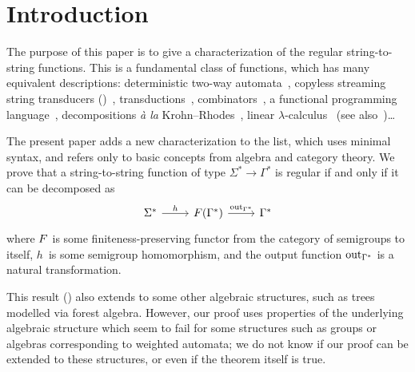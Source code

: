 \section{Introduction}
\label{sec:intro}

The purpose of this paper is to give a characterization of the regular string-to-string functions. This is a fundamental class of functions, which has many equivalent descriptions: deterministic two-way automata~\cite[Note~4]{shepherdson1959reduction}, copyless streaming string transducers (\sst)~\cite[Section~3]{alurExpressivenessStreamingString2010}, \mso transductions~\cite[Theorem~13]{engelfrietMSODefinableString2001}, combinators~\cite[Section~2]{alur2014regular}, a functional programming language~\cite[Section~6]{bojanczykRegularFirstOrderList2018}, decompositions \textit{à la} Krohn--Rhodes~\cite[Theorem~18, item~4]{bojanczykstefanski2020}, linear $\lambda$-calculus~\cite[Theorem~3]{LambdaTransducer} (see also~\cite[Claim~6.2]{IATLC})\ldots

The present paper adds a new characterization to the list, which uses minimal syntax, and refers only to basic concepts from algebra and category theory. We prove that a string-to-string function of type $\Sigma^* \to \Gamma^*$ is regular
if and only if it can be decomposed as 
\[
\begin{tikzcd}
    \Sigma^* 
    \ar[r,"h"]
    & 
    \functor(\Gamma^*)
    \ar[r,"\outfun_{\Gamma^*}"]
    &
    \Gamma^*
\end{tikzcd}
\]
where $\functor$ is some finiteness-preserving functor from the category of semigroups to itself, $h$~is some semigroup homomorphism, and the output function $\mathrm{out}_{\Gamma^*}$ is a natural transformation.

This result () also extends to some other algebraic structures, such as trees modelled via forest algebra. However, our proof uses properties of the underlying algebraic structure which seem to fail for some structures such as groups or algebras corresponding to weighted automata; we do not know if our proof can be extended to  these structures, or even if the theorem itself is true.

